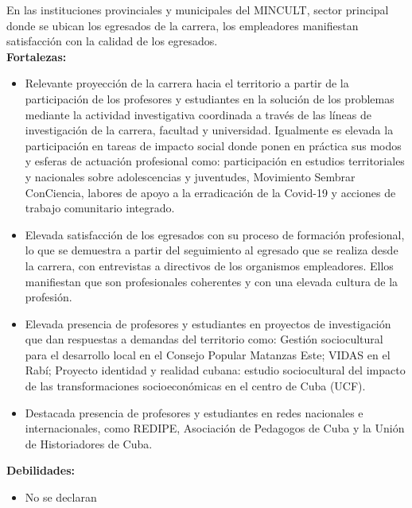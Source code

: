 En las instituciones provinciales y municipales del MINCULT, sector principal donde se ubican los egresados de la carrera, los empleadores manifiestan satisfacción con la calidad de los egresados.\\

\textbf{Fortalezas:}

\begin{itemize}
	\setlength\itemsep{-0.5em}
	\item Relevante proyección de la carrera hacia el territorio a partir de la participación de los profesores y estudiantes en la solución de los problemas mediante la actividad investigativa coordinada a través de las líneas de investigación de la carrera, facultad y universidad. Igualmente es elevada la participación en tareas de impacto social donde ponen en práctica sus modos y esferas de actuación profesional como: participación en estudios territoriales y nacionales sobre adolescencias y juventudes, Movimiento Sembrar ConCiencia, labores de apoyo a la erradicación de la Covid-19 y acciones de trabajo comunitario integrado.
	\item Elevada satisfacción de los egresados con su proceso de formación profesional, lo que se demuestra a partir del seguimiento al egresado que se realiza desde la carrera, con entrevistas a directivos de los organismos empleadores. Ellos manifiestan que son profesionales coherentes y con una elevada cultura de la profesión.
	\item Elevada presencia de profesores y estudiantes en proyectos de investigación que dan respuestas a demandas del territorio como: Gestión sociocultural para el desarrollo local en el Consejo Popular Matanzas Este; VIDAS en el Rabí; Proyecto identidad y realidad cubana: estudio sociocultural del impacto de las transformaciones socioeconómicas en el centro de Cuba (UCF).
	\item Destacada presencia de profesores y estudiantes en redes nacionales e internacionales, como REDIPE, Asociación de Pedagogos de Cuba y la Unión de Historiadores de Cuba.
\end{itemize}

\textbf{Debilidades:}
\begin{itemize}
	\setlength\itemsep{-0.5em}
	\item No se declaran
\end{itemize}